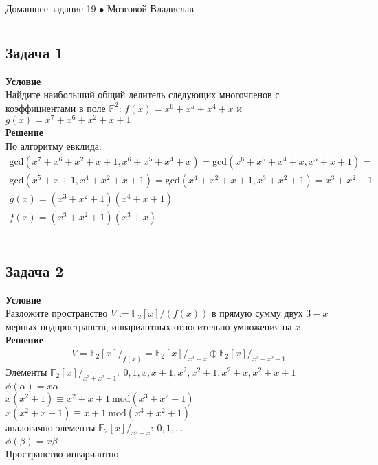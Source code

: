 \newpage
	{\large \hspace{3cm} \begin{center} Домашнее задание 19 $\bullet$ Мозговой Владислав \end{center} }
	\vspace{-1.5ex}
	\hrulefill
	
	\fontsize{12pt}{4.5mm}\selectfont
	\vspace{-3ex}
	\hrulefill
	\newline

	\section{}
		\subsection*{\textbf{Задача 1}}
		\textbf{Условие}\\
		Найдите наибольший общий делитель следующих многочленов с
		коэффициентами в поле $\mathbb{F}^2$: $f(x) = x^6+x^5+x^4+x$ и $g(x) = x^7+x^6+x^2+x+1$\\
		\textbf{Решение}\\
		По алгоритму евклида:
		\begin{gather*}
			\text{gcd}(x^7+x^6+x^2+x+1, x^6+x^5+x^4+x) = 
			\text{gcd}(x^6+x^5+x^4+x, x^5 + x + 1) = \\
			\text{gcd}(x^5 + x + 1, x^4 + x^2 + x + 1) = 
			\text{gcd}(x^4 + x^2 + x + 1, x^3 + x^2 + 1) = x^3 + x^2 + 1\\
			g(x) = (x^3 + x^2 + 1)(x^4 + x + 1)\\
			f(x) = (x^3 + x^2 + 1)(x^3 + x)
		\end{gather*}
		\\
		
		\subsection*{\textbf{Задача 2}}
		\textbf{Условие}\\
		Разложите пространство $V := \mathbb{F}_2[x]\slash(f(x))$ в прямую сумму двух $3-x$ мерных подпространств, инвариантных относительно умножения на $x$\\
		\textbf{Решение}\\
		\begin{gather*}
			V = \mathbb{F}_2[x]\slash_{f(x)} = \mathbb{F}_2[x]\slash_{x^3 + x} \oplus \mathbb{F}_2[x]\slash_{x^3 + x^2 + 1}
		\end{gather*}
		Элементы $\mathbb{F}_2[x]\slash_{x^3+x^2+1}:\ 0, 1, x, x+1, x^2, x^2+1, x^2+x, x^2+x+1$\\
		$\phi(\alpha) = x\alpha$\\
		$x(x^2+1) \equiv x^2 + x + 1\ \text{mod}(x^3+x^2+1)$\\
		$x(x^2+x+1) \equiv x + 1\ \text{mod}(x^3+x^2+1)$\\
		аналогично элементы $\mathbb{F}_2[x]\slash_{x^3+x}:\ 0, 1,\ldots$\\
		$\phi(\beta) = x\beta$\\
		Пространство инвариантно\\
		\\
		
